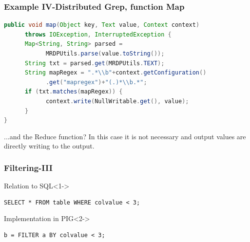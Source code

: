 \documentclass[xcolor=dvipsnames,dvip,notes=show,table]{beamer}
\begin{document}
\begin{frame}[fragile]
  \frametitle{Example IV-Distributed Grep, function Map}

\begin{lstlisting}[language=Java]
public void map(Object key, Text value, Context context)
      throws IOException, InterruptedException {
      Map<String, String> parsed = 
            MRDPUtils.parse(value.toString());
      String txt = parsed.get(MRDPUtils.TEXT);
      String mapRegex = ".*\\b"+context.getConfiguration()
            .get("mapregex")+"(.)*\\b.*";
      if (txt.matches(mapRegex)) {
            context.write(NullWritable.get(), value);
      }
}
\end{lstlisting}
\tiny

\begin{alertblock}{...and the Reduce function?}
 In this case it is not necessary and output values are directly writing to the output.
\end{alertblock}

\end{frame}


\begin{frame}[fragile]
  \frametitle{Filtering-III}
  \begin{block}{Relation to SQL}<1->
  
  \begin{lstlisting}
SELECT * FROM table WHERE colvalue < 3;
\end{lstlisting}
\end{block}

\begin{exampleblock}{Implementation in PIG}<2->

\begin{lstlisting}
b = FILTER a BY colvalue < 3;
\end{lstlisting}

\end{exampleblock}

\end{frame}






\end{document}
